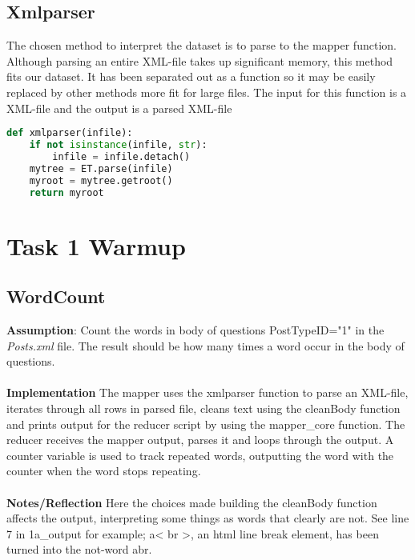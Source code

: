 \documentclass[fleqn,10pt]{wlscirep}
\begin{document}
\subsection{Xmlparser}
The chosen method to interpret the dataset is to parse to the mapper function. Although parsing an entire XML-file takes up significant memory, this method fits our dataset. It has been separated out as a function so it may be easily replaced by other methods more fit for large files. The input for this function is a XML-file and the output is a parsed XML-file 

\begin{lstlisting}[language=Python, caption=xmlparser function]
def xmlparser(infile):
    if not isinstance(infile, str):
        infile = infile.detach()
    mytree = ET.parse(infile)
    myroot = mytree.getroot()
    return myroot
\end{lstlisting}
\section{Task 1 Warmup}
\subsection{WordCount}
\textbf{Assumption}: Count the words in body of questions PostTypeID="1"  in the \textit{Posts.xml}  file. The result should be how many times a word occur in the body of questions.\\ \\
\textbf{Implementation} The mapper uses the xmlparser function to parse an XML-file, iterates through all rows in parsed file, cleans text using the cleanBody function and prints output for the reducer script by using the mapper\_core function.
The reducer receives the mapper output, parses it and loops through the output. A counter variable is used to track repeated words, outputting the word with the counter when the word stops repeating. \\ \\
\textbf{Notes/Reflection} Here the choices made building the cleanBody function affects the output, interpreting some things as words that clearly are not. See line 7 in 1a\_output for example; a< br >, an html line break element, has been turned into the not-word abr. \\ \\
\end{document}
